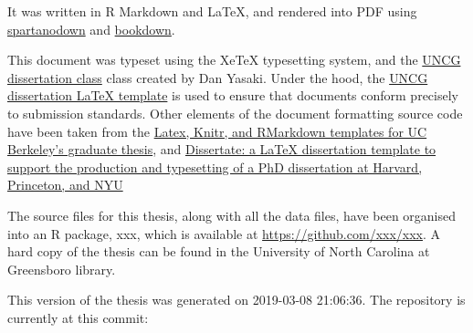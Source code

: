 \documentclass[ms]{uncgdissertationexp}
\theoremstyle{plain}
\theoremstyle{definition}
\theoremstyle{remark}
\begin{document}
  It was written in R Markdown and LaTeX, and rendered into PDF using
  \href{https://github.com/ashley-williams/spartanodown}{spartanodown} and
  \href{https://github.com/rstudio/bookdown}{bookdown}.
  
  This document was typeset using the XeTeX typesetting system, and the
  \href{https://mathstats.uncg.edu/wp-content/uploads/2018/08/uncgdissertationexp.cls}{UNCG
  dissertation class} class created by Dan Yasaki. Under the hood, the
  \href{https://mathstats.uncg.edu/wp-content/uploads/2018/08/sample.tex}{UNCG
  dissertation LaTeX template} is used to ensure that documents conform
  precisely to submission standards. Other elements of the document
  formatting source code have been taken from the
  \href{https://github.com/stevenpollack/ucbthesis}{Latex, Knitr, and
  RMarkdown templates for UC Berkeley's graduate thesis}, and
  \href{https://github.com/suchow/Dissertate}{Dissertate: a LaTeX
  dissertation template to support the production and typesetting of a PhD
  dissertation at Harvard, Princeton, and NYU}
  
  The source files for this thesis, along with all the data files, have
  been organised into an R package, xxx, which is available at
  \url{https://github.com/xxx/xxx}. A hard copy of the thesis can be found
  in the University of North Carolina at Greensboro library.
  
  This version of the thesis was generated on 2019-03-08 21:06:36. The
  repository is currently at this commit:
  
\end{document}
